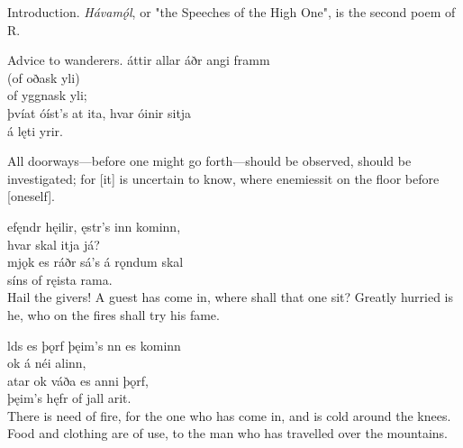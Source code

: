 \bookStart

	Introduction.
\small{\emph{Hávamǫ́l}, or "the Speeches of the High One\footnotemark[1]", is the second poem of R.}

	Advice to wanderers.
\bva {}áttir allar \hld áðr angi framm \\%
\ind (of oðask yli)\footnotemark[2] \\%
\ind of yggnask yli; \\%
þvíat óíst's at ita, \hld hvar óinir sitja\footnotemark[3] \\%
\ind á lęti yrir.\\%

\bvb All doorways—before one might go forth—should be observed, should be investigated; for [it] is uncertain to know, where enemies\footnotemark[1] sit on the floor before [oneself]. \\		

\bva {}efęndr hęilir, \hld {}ęstr's inn kominn, \\%
\ind hvar skal itja já? \\%
mjǫk es ráðr \hld sá's á rǫndum skal \\%
\ind síns of ręista rama.\\%

\bvb Hail the givers\footnotemark[5]! A guest has come in, where shall that one sit? Greatly hurried is he, who on the fires shall try his fame. \\

\bva {}lds es þǫrf \hld þęim's nn es kominn \\%
\ind ok á néi alinn, \\%
atar ok váða \hld es anni þǫrf, \\%
\ind þęim's hęfr of jall arit.\\%

\bvb There is need of fire, for the one who has come in, and is cold around the knees. Food and clothing are of use, to the man who has travelled over the mountains. \\

